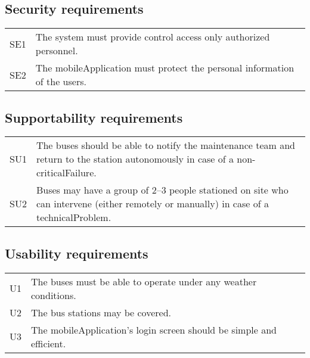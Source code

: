 \documentclass[a4paper]{article}
\begin{document}

\subsection{Security requirements}
\begin{tabularx}{\textwidth}{p{.75cm} X}
	SE1 & The system must provide control access only \gls{authorized}
	      personnel. \\

	SE2 & The \gls{mobileApplication} must protect the personal information
	      of the users. \\
\end{tabularx}


\subsection{Supportability requirements}
\begin{tabularx}{\textwidth}{p{.75cm} X}
	SU1 & The buses should be able to notify the maintenance team and return
	      to the \gls{station} \gls{autonomous}ly in case of a
	      \gls{non-criticalFailure}. \\

	SU2 & Buses may have a group of 2–3 people \gls{station}ed on \gls{site}
	      who can intervene (either remotely or manually) in case of a
	      \gls{technicalProblem}. \\
\end{tabularx}


\subsection{Usability requirements}
\begin{tabularx}{\textwidth}{p{.75cm} X}
        U1 & The buses must be able to operate under any weather conditions. \\

        U2 & The bus \gls{station}s may be covered. \\

	U3 & The \gls{mobileApplication}’s login screen should be simple and
	     efficient. \\
\end{tabularx}

\end{document}
